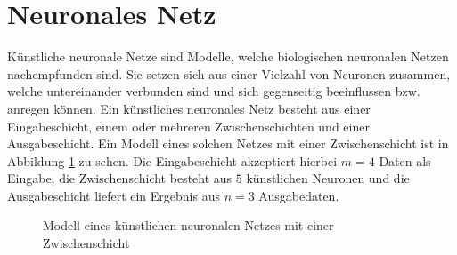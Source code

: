 \section{Neuronales Netz}
K\"unstliche neuronale Netze sind Modelle, welche biologischen neuronalen Netzen nachempfunden sind. Sie setzen sich aus einer Vielzahl von Neuronen zusammen, welche untereinander verbunden sind und sich gegenseitig beeinflussen bzw. anregen k\"onnen. Ein k\"unstliches neuronales Netz besteht aus einer Eingabeschicht, einem oder mehreren Zwischenschichten und einer Ausgabeschicht. Ein Modell eines solchen Netzes mit einer Zwischenschicht ist in Abbildung \ref{fig:classification_neuralnetwork} zu sehen. Die Eingabeschicht akzeptiert hierbei \(m=4\) Daten als Eingabe, die Zwischenschicht besteht aus \(5\) k\"unstlichen Neuronen und die Ausgabeschicht  liefert ein Ergebnis aus \(n=3\) Ausgabedaten.

\begin{figure}
\centering
\def\layersep{3cm}
\caption{Modell eines k\"unstlichen neuronalen Netzes mit einer Zwischenschicht}
\label{fig:classification_neuralnetwork}
\end{figure}

